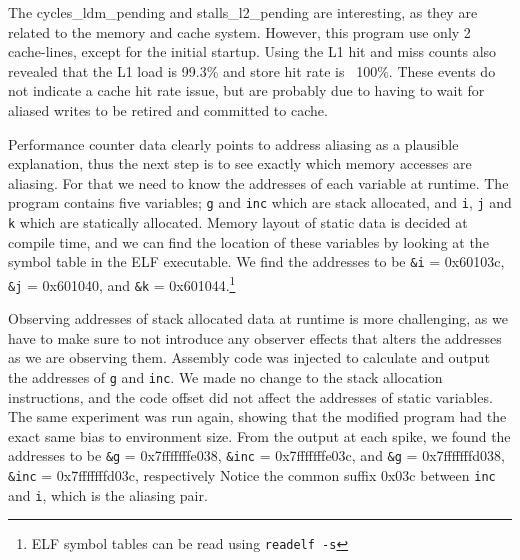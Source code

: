 \documentclass{acm_proc_article-sp}
\begin{document}
The cycles\_ldm\_pending and stalls\_l2\_pending are interesting, as they are related to the memory and cache system.
However, this program use only 2 cache-lines, except for the initial startup.
Using the L1 hit and miss counts also revealed that the L1 load is 99.3\% and store hit rate is ~100\%.
These events do not indicate a cache hit rate issue, but are probably due to having to wait for aliased writes to be retired and committed to cache.

Performance counter data clearly points to address aliasing as a plausible explanation, thus the next step is to see exactly which memory accesses are aliasing. 
For that we need to know the addresses of each variable at runtime.
The program contains five variables; \texttt{g} and \texttt{inc} which are stack allocated, and \texttt{i}, \texttt{j} and \texttt{k} which are statically allocated.
Memory layout of static data is decided at compile time, and we can find the location of these variables by looking at the symbol table in the ELF executable.
We find the addresses to be \texttt{\&i} = 0x60103c, \texttt{\&j} = 0x601040, and \texttt{\&k} = 0x601044.\footnote{ELF symbol tables can be read using \texttt{readelf -s}}

Observing addresses of stack allocated data at runtime is more challenging, as we have to make sure to not introduce any observer effects that alters the addresses as we are observing them.
Assembly code was injected to calculate and output the addresses of \texttt{g} and \texttt{inc}.
We made no change to the stack allocation instructions, and the code offset did not affect the addresses of static variables.
The same experiment was run again, showing that the modified program had the exact same bias to environment size.
From the output at each spike, we found the addresses to be \texttt{\&g} = 0x7fffffffe038, \texttt{\&inc} = 0x7fffffffe03c, and \texttt{\&g} = 0x7fffffffd038, \texttt{\&inc} = 0x7fffffffd03c, respectively
Notice the common suffix 0x03c between \texttt{inc} and \texttt{i}, which is the aliasing pair.


% 
\end{document}
